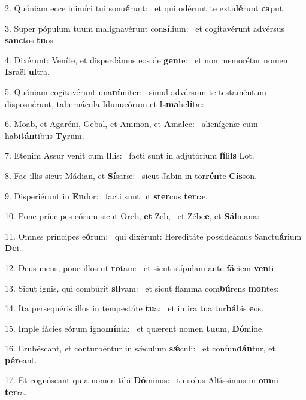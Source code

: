 2. Quóniam ecce inimíci tui sonu\textbf{é}runt: \ast\  et qui odérunt te extu\textbf{lé}runt \textbf{ca}put.\

3. Super pópulum tuum malignavérunt con\textbf{sí}lium: \ast\  et cogitavérunt advérsus \textbf{sanc}tos \textbf{tu}os.\

4. Dixérunt: Veníte, et disperdámus eos de \textbf{gen}te: \ast\  et non memorétur nomen \textbf{Is}raël \textbf{ul}tra.\

5. Quóniam cogitavérunt una\textbf{ní}miter: \ast\  simul advérsum te testaméntum disposuérunt, tabernácula Idumæórum et Is\textbf{ma}he\textbf{lí}tæ:\

6. Moab, et Agaréni, Gebal, et Ammon, et \textbf{A}malec: \ast\  alienígenæ cum habi\textbf{tán}tibus \textbf{Ty}rum.\

7. Etenim Assur venit cum \textbf{il}lis: \ast\  facti sunt in adjutórium \textbf{fí}li\textbf{is} Lot.\

8. Fac illis sicut Mádian, et \textbf{Sí}saræ: \ast\  sicut Jabin in tor\textbf{rén}te \textbf{Cis}son.\

9. Disperiérunt in \textbf{En}dor: \ast\  facti sunt ut \textbf{ster}cus \textbf{ter}ræ.\

10. Pone príncipes eórum sicut Oreb, \textbf{et} Zeb, \ast\  et Zébe\textbf{e}, et \textbf{Sál}mana:\

11. Omnes príncipes e\textbf{ó}rum: \ast\  qui dixérunt: Hereditáte possideámus Sanctu\textbf{á}rium \textbf{De}i.\

12. Deus meus, pone illos ut \textbf{ro}tam: \ast\  et sicut stípulam ante \textbf{fá}ciem \textbf{ven}ti.\

13. Sicut ignis, qui combúrit \textbf{sil}vam: \ast\  et sicut flamma com\textbf{bú}rens \textbf{mon}tes:\

14. Ita persequéris illos in tempestáte \textbf{tu}a: \ast\  et in ira tua tur\textbf{bá}bis \textbf{e}os.\

15. Imple fácies eórum igno\textbf{mí}nia: \ast\  et quærent nomen \textbf{tu}um, \textbf{Dó}mine.\

16. Erubéscant, et conturbéntur in sǽculum \textbf{sǽ}culi: \ast\  et confun\textbf{dán}tur, et \textbf{pér}eant.\

17. Et cognóscant quia nomen tibi \textbf{Dó}minus: \ast\  tu solus Altíssimus in \textbf{om}ni \textbf{ter}ra.\

